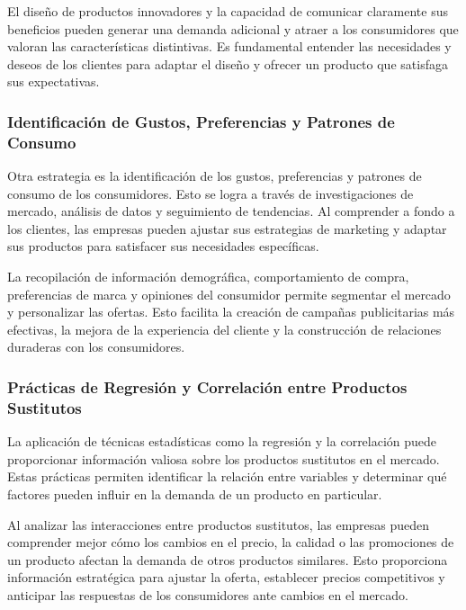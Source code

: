 \documentclass[
  letterpaper,
  DIV=11,
  numbers=noendperiod]{scrartcl}
\begin{document}
El diseño de productos innovadores y la capacidad de comunicar
claramente sus beneficios pueden generar una demanda adicional y atraer
a los consumidores que valoran las características distintivas. Es
fundamental entender las necesidades y deseos de los clientes para
adaptar el diseño y ofrecer un producto que satisfaga sus expectativas.

\hypertarget{identificaciuxf3n-de-gustos-preferencias-y-patrones-de-consumo}{%
\subsubsection{Identificación de Gustos, Preferencias y Patrones de
Consumo}\label{identificaciuxf3n-de-gustos-preferencias-y-patrones-de-consumo}}

Otra estrategia es la identificación de los gustos, preferencias y
patrones de consumo de los consumidores. Esto se logra a través de
investigaciones de mercado, análisis de datos y seguimiento de
tendencias. Al comprender a fondo a los clientes, las empresas pueden
ajustar sus estrategias de marketing y adaptar sus productos para
satisfacer sus necesidades específicas.

La recopilación de información demográfica, comportamiento de compra,
preferencias de marca y opiniones del consumidor permite segmentar el
mercado y personalizar las ofertas. Esto facilita la creación de
campañas publicitarias más efectivas, la mejora de la experiencia del
cliente y la construcción de relaciones duraderas con los consumidores.

\hypertarget{pruxe1cticas-de-regresiuxf3n-y-correlaciuxf3n-entre-productos-sustitutos}{%
\subsubsection{Prácticas de Regresión y Correlación entre Productos
Sustitutos}\label{pruxe1cticas-de-regresiuxf3n-y-correlaciuxf3n-entre-productos-sustitutos}}

La aplicación de técnicas estadísticas como la regresión y la
correlación puede proporcionar información valiosa sobre los productos
sustitutos en el mercado. Estas prácticas permiten identificar la
relación entre variables y determinar qué factores pueden influir en la
demanda de un producto en particular.

Al analizar las interacciones entre productos sustitutos, las empresas
pueden comprender mejor cómo los cambios en el precio, la calidad o las
promociones de un producto afectan la demanda de otros productos
similares. Esto proporciona información estratégica para ajustar la
oferta, establecer precios competitivos y anticipar las respuestas de
los consumidores ante cambios en el mercado.
\end{document}
